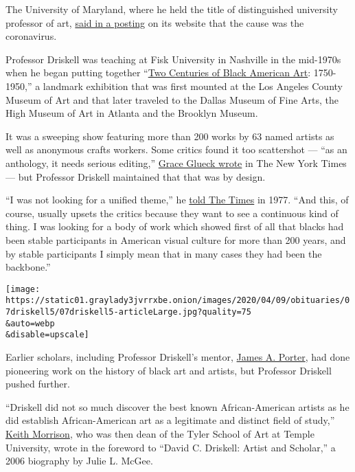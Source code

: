 The University of Maryland, where he held the title of distinguished
university professor of art,
\href{https://arhu.umd.edu/news/david-c-driskell-african-american-art-pioneer-dies-88}{said
in a posting} on its website that the cause was the coronavirus.

Professor Driskell was teaching at Fisk University in Nashville in the
mid-1970s when he began putting together
``\href{https://www.lacma.org/art/exhibition/two-centuries-black-american-art}{Two
Centuries of Black American Art}: 1750-1950,'' a landmark exhibition
that was first mounted at the Los Angeles County Museum of Art and that
later traveled to the Dallas Museum of Fine Arts, the High Museum of Art
in Atlanta and the Brooklyn Museum.

It was a sweeping show featuring more than 200 works by 63 named artists
as well as anonymous crafts workers. Some critics found it too
scattershot --- ``as an anthology, it needs serious editing,''
\href{https://www.nytimes3xbfgragh.onion/1977/06/24/archives/2-centuries-of-black-art-at-brooklyn-two-centuries-of-black-art.html?searchResultPosition=1}{Grace
Glueck wrote} in The New York Times --- but Professor Driskell
maintained that that was by design.

``I was not looking for a unified theme,'' he
\href{https://www.nytimes3xbfgragh.onion/1977/06/29/archives/black-art-label-disputed-by-curator.html?searchResultPosition=1}{told
The Times} in 1977. ``And this, of course, usually upsets the critics
because they want to see a continuous kind of thing. I was looking for a
body of work which showed first of all that blacks had been stable
participants in American visual culture for more than 200 years, and by
stable participants I simply mean that in many cases they had been the
backbone.''

\texttt{[image: https://static01.graylady3jvrrxbe.onion/images/2020/04/09/obituaries/07driskell5/07driskell5-articleLarge.jpg?quality=75\\\&auto=webp\\\&disable=upscale]}

Earlier scholars, including Professor Driskell's mentor,
\href{https://americanart.si.edu/artist/james-porter-3843}{James A.
Porter}, had done pioneering work on the history of black art and
artists, but Professor Driskell pushed further.

``Driskell did not so much discover the best known African-American
artists as he did establish African-American art as a legitimate and
distinct field of study,''
\href{http://keithmorrison.com/?page_id=207}{Keith Morrison}, who was
then dean of the Tyler School of Art at Temple University, wrote in the
foreword to ``David C. Driskell: Artist and Scholar,'' a 2006 biography
by Julie L. McGee.

